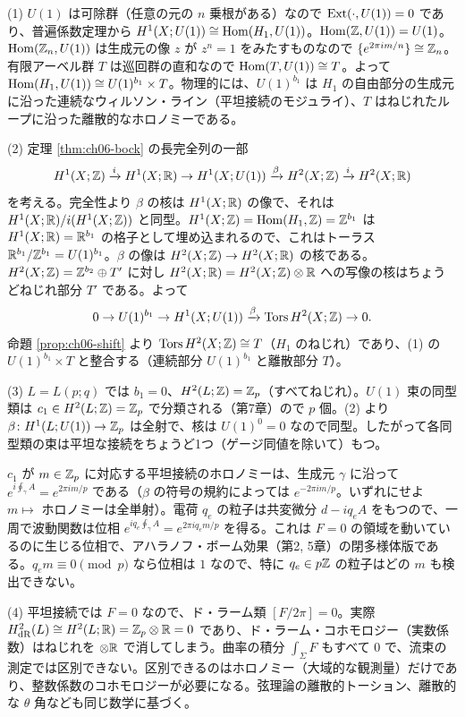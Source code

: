 \begin{solution}
(1) $U(1)$ は可除群（任意の元の $n$ 乗根がある）なので $\operatorname{Ext}(\cdot,U(1))=0$ であり、普遍係数定理から $H^1(X;U(1))\cong\operatorname{Hom}(H_1,U(1))$。$\operatorname{Hom}(\mathbb{Z},U(1))=U(1)$。$\operatorname{Hom}(\mathbb{Z}_n,U(1))$ は生成元の像 $z$ が $z^n=1$ をみたすものなので $\{e^{2\pi im/n}\}\cong\mathbb{Z}_n$。有限アーベル群 $T$ は巡回群の直和なので $\operatorname{Hom}(T,U(1))\cong T$。よって $\operatorname{Hom}(H_1,U(1))\cong U(1)^{b_1}\times T$。物理的には、$U(1)^{b_1}$ は $H_1$ の自由部分の生成元に沿った連続なウィルソン・ライン（平坦接続のモジュライ）、$T$ はねじれたループに沿った離散的なホロノミーである。

(2) 定理 \ref{thm:ch06-bock} の長完全列の一部
\[
H^1(X;\mathbb{Z})\xrightarrow{i}H^1(X;\mathbb{R})\to H^1(X;U(1))\xrightarrow{\beta}H^2(X;\mathbb{Z})\xrightarrow{i}H^2(X;\mathbb{R})
\]
を考える。完全性より $\beta$ の核は $H^1(X;\mathbb{R})$ の像で、それは $H^1(X;\mathbb{R})/i(H^1(X;\mathbb{Z}))$ と同型。$H^1(X;\mathbb{Z})=\operatorname{Hom}(H_1,\mathbb{Z})=\mathbb{Z}^{b_1}$ は $H^1(X;\mathbb{R})=\mathbb{R}^{b_1}$ の格子として埋め込まれるので、これはトーラス $\mathbb{R}^{b_1}/\mathbb{Z}^{b_1}=U(1)^{b_1}$。$\beta$ の像は $H^2(X;\mathbb{Z})\to H^2(X;\mathbb{R})$ の核である。$H^2(X;\mathbb{Z})=\mathbb{Z}^{b_2}\oplus T'$ に対し $H^2(X;\mathbb{R})=H^2(X;\mathbb{Z})\otimes\mathbb{R}$ への写像の核はちょうどねじれ部分 $T'$ である。よって
\[
0\to U(1)^{b_1}\to H^1(X;U(1))\xrightarrow{\beta}\operatorname{Tors}H^2(X;\mathbb{Z})\to0 .
\]
命題 \ref{prop:ch06-shift} より $\operatorname{Tors}H^2(X;\mathbb{Z})\cong T$（$H_1$ のねじれ）であり、(1) の $U(1)^{b_1}\times T$ と整合する（連続部分 $U(1)^{b_1}$ と離散部分 $T$）。

(3) $L=L(p;q)$ では $b_1=0$、$H^2(L;\mathbb{Z})=\mathbb{Z}_p$（すべてねじれ）。$U(1)$ 束の同型類は $c_1\in H^2(L;\mathbb{Z})=\mathbb{Z}_p$ で分類される（第7章）ので $p$ 個。(2) より $\beta\colon H^1(L;U(1))\to\mathbb{Z}_p$ は全射で、核は $U(1)^0=0$ なので同型。したがって各同型類の束は平坦な接続をちょうど1つ（ゲージ同値を除いて）もつ。

$c_1$ が $m\in\mathbb{Z}_p$ に対応する平坦接続のホロノミーは、生成元 $\gamma$ に沿って $e^{i\oint_\gamma A}=e^{2\pi im/p}$ である（$\beta$ の符号の規約によっては $e^{-2\pi im/p}$。いずれにせよ $m\mapsto$ ホロノミーは全単射）。電荷 $q_e$ の粒子は共変微分 $d-iq_eA$ をもつので、一周で波動関数は位相 $e^{iq_e\oint_\gamma A}=e^{2\pi iq_em/p}$ を得る。これは $F=0$ の領域を動いているのに生じる位相で、アハラノフ・ボーム効果（第2, 5章）の閉多様体版である。$q_e m\equiv0\pmod p$ なら位相は $1$ なので、特に $q_e\in p\mathbb{Z}$ の粒子はどの $m$ も検出できない。

(4) 平坦接続では $F=0$ なので、ド・ラーム類 $[F/2\pi]=0$。実際 $H^2_{\mathrm{dR}}(L)\cong H^2(L;\mathbb{R})=\mathbb{Z}_p\otimes\mathbb{R}=0$ であり、ド・ラーム・コホモロジー（実数係数）はねじれを $\otimes\mathbb{R}$ で消してしまう。曲率の積分 $\int_\Sigma F$ もすべて $0$ で、流束の測定では区別できない。区別できるのはホロノミー（大域的な観測量）だけであり、整数係数のコホモロジーが必要になる。弦理論の離散的トーション、離散的な $\theta$ 角なども同じ数学に基づく。
\end{solution}

